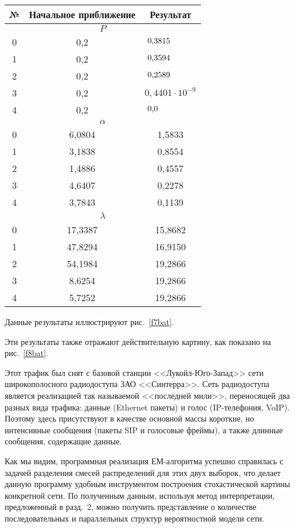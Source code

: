 \begin{multicols}{2}
\begin{table*}
\begin{minipage}[t]{76mm}
\begin{center}
\tabcolsep=8.7pt
\begin{tabular}{|c|c|c|}
\hline
№&Начальное приближение&Результат\\
\hline
\multicolumn{3}{|c|}{$P$}\\
\hline
0&0,2&$0{,}3815\hphantom{{}\cdot 10^{-9}}$\\
1&0,2&$0{,}3594\hphantom{{}\cdot 10^{-9}}$\\
2&0,2&$0{,}2589\hphantom{{}\cdot 10^{-9}}$\\
3&0,2&$0{,}4401\cdot 10^{-9}$\\
4&0,2&$0{,}0\hphantom{{}\cdot 10^{-9}999}$\\
\hline
\multicolumn{3}{|c|}{$\alpha$}\\
\hline
0&6,0804&1,5833\\
1&3,1838&0,8554\\
2&1,4886&0,4557\\
3&4,6407&0,2278\\
4&3,7843&0,1139\\
\hline
\multicolumn{3}{|c|}{$\lambda$}\\
\hline
0&17,3387&15,8682\\
1&47,8294&16,9150\\
2&54,1984&19,2866\\
3&\hphantom{1}8,6254&19,2866\\
4&\hphantom{1}5,7252&19,2866\\
\hline
\end{tabular}
\end{center}
\end{minipage}
\end{table*}


Данные результаты иллюстрируют рис.~\ref{f7bat}.


Эти результаты также отражают действительную картину, как показано на
рис.~\ref{f8bat}.


Этот трафик был снят с базовой станции <<Лукойл-Юго-Запад>> сети
широкополосного радиодоступа ЗАО <<Синтерра>>. Сеть радиодоступа
является реализацией так называемой <<последней мили>>, переносящей два
разных вида трафика: данные (Ethernet пакеты) и голос (IP-телефония, VoIP).
Поэтому здесь присутствуют в качестве основной массы короткие, но
интенсивные сообщения (пакеты SIP и голосовые фреймы), а также длинные
сообщения, содержащие данные.

Как мы видим, программная реализация ЕМ-ал\-го\-рит\-ма успешно справилась с
задачей разделения смесей распределений для этих двух выборок, что делает
данную программу удобным инструментом построения стохастической картины
конкретной сети. По полученным данным, используя метод интерпретации,
предложенный в разд.~2, можно получить представление о количестве
последовательных и параллельных структур вероятностной модели сети.


\end{multicols}
